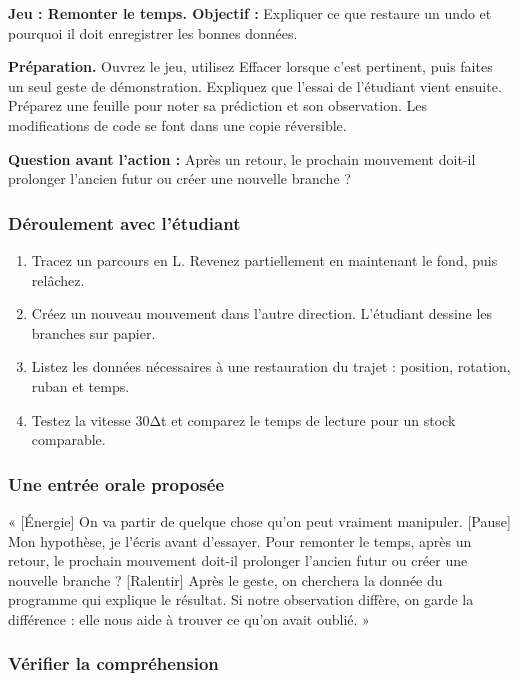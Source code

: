 \documentclass[
  canadien,
  11pt,
  letterpaper,
]{article}
\providecommand{\tightlist}{%
  \setlength{\itemsep}{0pt}\setlength{\parskip}{0pt}}
\begin{document}
\textbf{Jeu : Remonter le temps. Objectif :} Expliquer ce que restaure
un undo et pourquoi il doit enregistrer les bonnes données.

\textbf{Préparation.} Ouvrez le jeu, utilisez Effacer lorsque c'est
pertinent, puis faites un seul geste de démonstration. Expliquez que
l'essai de l'étudiant vient ensuite. Préparez une feuille pour noter sa
prédiction et son observation. Les modifications de code se font dans
une copie réversible.

\textbf{Question avant l'action :} Après un retour, le prochain
mouvement doit-il prolonger l'ancien futur ou créer une nouvelle branche
?

\subsubsection{Déroulement avec
l'étudiant}\label{duxe9roulement-avec-luxe9tudiant-12}

\begin{enumerate}
\def\labelenumi{\arabic{enumi}.}
\tightlist
\item
  Tracez un parcours en L. Revenez partiellement en maintenant le fond,
  puis relâchez.
\item
  Créez un nouveau mouvement dans l'autre direction. L'étudiant dessine
  les branches sur papier.
\item
  Listez les données nécessaires à une restauration du trajet :
  position, rotation, ruban et temps.
\item
  Testez la vitesse 30Δt et comparez le temps de lecture pour un stock
  comparable.
\end{enumerate}

\subsubsection{Une entrée orale
proposée}\label{une-entruxe9e-orale-proposuxe9e-12}

« {[}Énergie{]} On va partir de quelque chose qu'on peut vraiment
manipuler. {[}Pause{]} Mon hypothèse, je l'écris avant d'essayer. Pour
remonter le temps, après un retour, le prochain mouvement doit-il
prolonger l'ancien futur ou créer une nouvelle branche ? {[}Ralentir{]}
Après le geste, on cherchera la donnée du programme qui explique le
résultat. Si notre observation diffère, on garde la différence : elle
nous aide à trouver ce qu'on avait oublié. »

\subsubsection{Vérifier la
compréhension}\label{vuxe9rifier-la-compruxe9hension-12}
\end{document}
